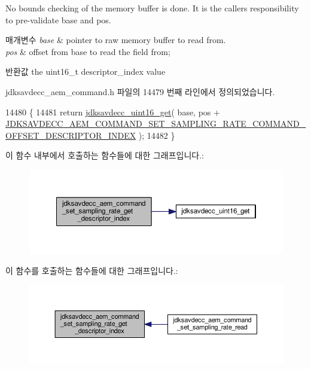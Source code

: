 No bounds checking of the memory buffer is done. It is the caller\textquotesingle{}s responsibility to pre-\/validate base and pos.


\begin{DoxyParams}{매개변수}
{\em base} & pointer to raw memory buffer to read from. \\
\hline
{\em pos} & offset from base to read the field from; \\
\hline
\end{DoxyParams}
\begin{DoxyReturn}{반환값}
the uint16\+\_\+t descriptor\+\_\+index value 
\end{DoxyReturn}


jdksavdecc\+\_\+aem\+\_\+command.\+h 파일의 14479 번째 라인에서 정의되었습니다.


\begin{DoxyCode}
14480 \{
14481     \textcolor{keywordflow}{return} \hyperlink{group__endian_ga3fbbbc20be954aa61e039872965b0dc9}{jdksavdecc\_uint16\_get}( base, pos + 
      \hyperlink{group__command__set__sampling__rate_ga664b4432990c0a0b15deddcca3bd7aed}{JDKSAVDECC\_AEM\_COMMAND\_SET\_SAMPLING\_RATE\_COMMAND\_OFFSET\_DESCRIPTOR\_INDEX}
       );
14482 \}
\end{DoxyCode}


이 함수 내부에서 호출하는 함수들에 대한 그래프입니다.\+:
\nopagebreak
\begin{figure}[H]
\begin{center}
\leavevmode
\includegraphics[width=350pt]{group__command__set__sampling__rate_ga06e493dfcb568cb8c720dec39d89b8eb_cgraph}
\end{center}
\end{figure}




이 함수를 호출하는 함수들에 대한 그래프입니다.\+:
\nopagebreak
\begin{figure}[H]
\begin{center}
\leavevmode
\includegraphics[width=350pt]{group__command__set__sampling__rate_ga06e493dfcb568cb8c720dec39d89b8eb_icgraph}
\end{center}
\end{figure}


